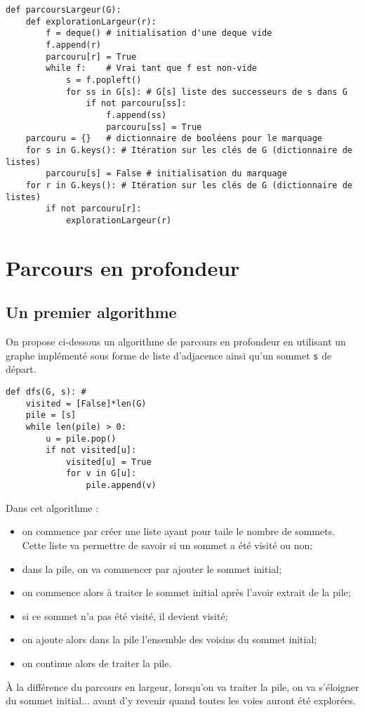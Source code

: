 \begin{lstlisting}
def parcoursLargeur(G):
    def explorationLargeur(r):
        f = deque() # initialisation d'une deque vide
        f.append(r)
        parcouru[r] = True
        while f:    # Vrai tant que f est non-vide
            s = f.popleft()
            for ss in G[s]: # G[s] liste des successeurs de s dans G
                if not parcouru[ss]:
                    f.append(ss)
                    parcouru[ss] = True
    parcouru = {}   # dictionnaire de booléens pour le marquage
    for s in G.keys(): # Itération sur les clés de G (dictionnaire de listes)
        parcouru[s] = False # initialisation du marquage
    for r in G.keys(): # Itération sur les clés de G (dictionnaire de listes)
        if not parcouru[r]:
            explorationLargeur(r)
\end{lstlisting}

\section{Parcours en profondeur}
\subsection{Un premier algorithme}

On propose ci-dessous un algorithme de parcours en profondeur en utilisant un graphe implémenté sous forme de liste d'adjacence ainsi qu'un sommet \texttt{s} de départ. 

\begin{lstlisting}
def dfs(G, s): #
    visited = [False]*len(G)
    pile = [s]
    while len(pile) > 0:
        u = pile.pop()
        if not visited[u]:
            visited[u] = True
            for v in G[u]:
                pile.append(v)
\end{lstlisting}

Dans cet algorithme : 
\begin{itemize}
\item on commence par créer une liste ayant pour taile le nombre de sommets. Cette liste va permettre de savoir si un sommet a été visité ou non;
\item dans la pile, on va commencer par ajouter le sommet initial;
\item on commence alors à traiter le sommet initial après l'avoir extrait de la pile;
\item si ce sommet n'a pas été visité, il devient visité;
\item on ajoute alors dans la pile l'ensemble des voisins du sommet initial;
\item on continue alors de traiter la pile. 
\end{itemize}
À la différence du parcours en largeur, lorsqu'on va traiter la pile, on va s'éloigner du sommet initial... avant d'y revenir quand toutes les voies auront été explorées. 

